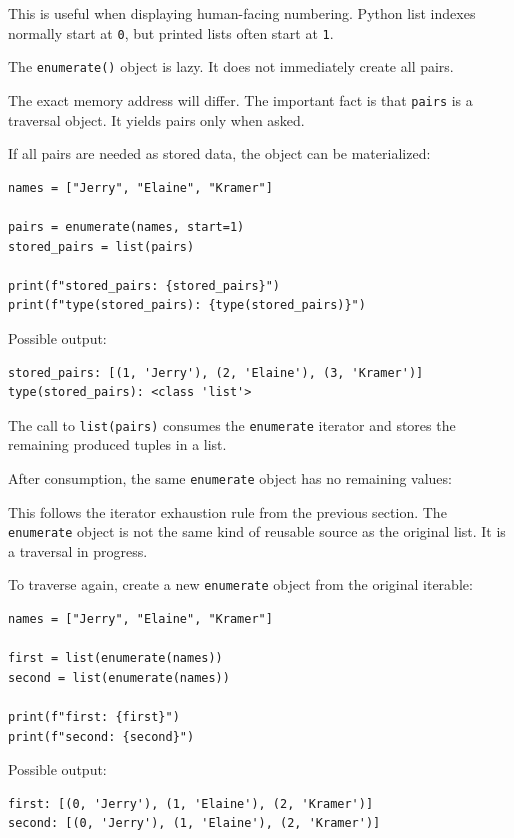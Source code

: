 This is useful when displaying human-facing numbering. Python list indexes normally start at \texttt{0}, but printed lists often start at \texttt{1}.

The \texttt{enumerate()} object is lazy. It does not immediately create all pairs.

The exact memory address will differ. The important fact is that \texttt{pairs} is a traversal object. It yields pairs only when asked.

If all pairs are needed as stored data, the object can be materialized:

\begin{verbatim}
names = ["Jerry", "Elaine", "Kramer"]

pairs = enumerate(names, start=1)
stored_pairs = list(pairs)

print(f"stored_pairs: {stored_pairs}")
print(f"type(stored_pairs): {type(stored_pairs)}")
\end{verbatim}

Possible output:

\begin{verbatim}
stored_pairs: [(1, 'Jerry'), (2, 'Elaine'), (3, 'Kramer')]
type(stored_pairs): <class 'list'>
\end{verbatim}

The call to \texttt{list(pairs)} consumes the \texttt{enumerate} iterator and stores the remaining produced tuples in a list.

After consumption, the same \texttt{enumerate} object has no remaining values:

This follows the iterator exhaustion rule from the previous section. The \texttt{enumerate} object is not the same kind of reusable source as the original list. It is a traversal in progress.

To traverse again, create a new \texttt{enumerate} object from the original iterable:

\begin{verbatim}
names = ["Jerry", "Elaine", "Kramer"]

first = list(enumerate(names))
second = list(enumerate(names))

print(f"first: {first}")
print(f"second: {second}")
\end{verbatim}

Possible output:

\begin{verbatim}
first: [(0, 'Jerry'), (1, 'Elaine'), (2, 'Kramer')]
second: [(0, 'Jerry'), (1, 'Elaine'), (2, 'Kramer')]
\end{verbatim}

